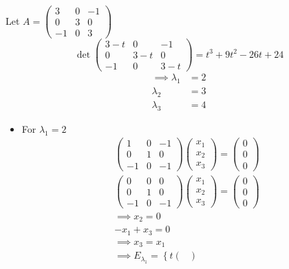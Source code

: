 \begin{enumerate}
Let $A = \begin{pmatrix}
3 & 0 & -1\\
0 & 3 & 0\\
-1 & 0 & 3
\end{pmatrix}$
\begin{equation}
\det{
\begin{pmatrix}
3-t & 0 & -1\\
0 & 3- t & 0\\
-1 & 0 & 3-t
\end{pmatrix}
} = t^3+9t^2-26t+24
\end{equation}
\begin{align}
\implies \lambda_1 &= 2\\
\lambda_2 &= 3\\
\lambda_3 &= 4
\end{align}
\begin{itemize}
\item For $\lambda_1 = 2$
\begin{gather}
\begin{pmatrix}
1 & 0 & -1\\
0 & 1 & 0\\
-1 & 0 & -1
\end{pmatrix}
\begin{pmatrix}
x_1\\x_2\\x_3
\end{pmatrix}
=
\begin{pmatrix}
0\\0\\0
\end{pmatrix}\\
\begin{pmatrix}
0 & 0 & 0\\
0 & 1 & 0\\
-1 & 0 & -1
\end{pmatrix}
\begin{pmatrix}
x_1\\x_2\\x_3
\end{pmatrix}
=
\begin{pmatrix}
0\\0\\0
\end{pmatrix}\\
\implies x_2 = 0\\
-x_1 + x_3 = 0\\
\implies x_3 = x_1\\
\implies E_{\lambda_1} = \left\{
t\begin{pmatrix}

\end{pmatrix}
\end{gather}
\end{itemize}
\end{enumerate}
